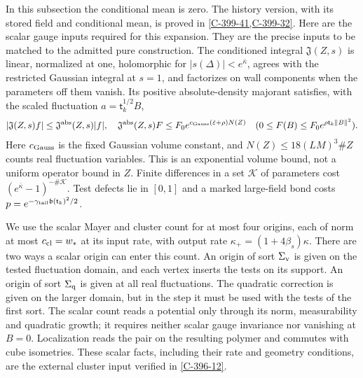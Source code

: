 \documentclass[11pt,letterpaper,reqno]{amsart}
\theoremstyle{definition}
\theoremstyle{remark}
\begin{document}
In this subsection the conditional mean is zero.  The history
version, with its stored field and conditional mean, is proved
in \cref{C-399-41,C-399-32}.
Here are the scalar gauge inputs required for this expansion.
They are the precise inputs to be matched to the admitted pure
construction.  The conditioned integral $\mathfrak J(Z,s)$ is
linear, normalized at one, holomorphic for
$|s(\Delta)|<e^{\bar\kappa}$, agrees with the restricted Gaussian
integral at $s=1$, and factorizes on wall components when the
parameters off them vanish.  Its positive absolute-density
majorant satisfies, with the scaled fluctuation $a=\mathsf t_k^{1/2}B$,
\[
 |\mathfrak J(Z,s)f|\le\mathfrak J^{\rm abs}(Z,s)|f|,
 \quad
 \mathfrak J^{\rm abs}(Z,s)F
 \le F_0e^{c_{\rm Gauss}(\hat\varepsilon+\rho)N(Z)}
 \quad(0\le F(B)\le F_0e^{\rho \mathsf t_k\|B\|^2}).
\]
Here $c_{\rm Gauss}$ is the fixed Gaussian volume constant, and
$N(Z)\le18(LM)^3\#Z$ counts real fluctuation variables.
This is an exponential volume bound, not a uniform operator
bound in $Z$.  Finite differences in a set $\mathcal K$ of
parameters cost $(e^{\bar\kappa}-1)^{-\#\mathcal K}$.
Test defects lie in $[0,1]$ and a marked large-field bond costs
$p=e^{-\gamma_{\rm tail}\mathfrak b(\mathsf t_k)^2/2}$.

We use the scalar Mayer and cluster count for at most four
origins, each of norm at most $c_{\rm cl}=w_*$ at its input
rate, with output rate $\kappa_+=(1+4\beta_s)\kappa$.
There are two ways a scalar origin can enter this count.
An origin of sort $\Sigma_{\rm v}$ is given on the tested
fluctuation domain, and each vertex inserts the tests on its
support.  An origin of sort $\Sigma_{\rm q}$ is given at all
real fluctuations.  The quadratic correction is given on the
larger domain, but in the step it must be used with the tests
of the first sort.
The scalar count reads a potential only through its norm,
measurability and quadratic growth; it requires neither scalar
gauge invariance nor vanishing at $B=0$.  Localization reads
the pair on the resulting polymer and commutes with cube
isometries.  These scalar facts, including their rate and geometry conditions,
are the external cluster input verified in \cref{C-396-12}.
\end{document}
